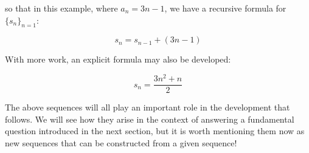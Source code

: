 \documentclass{ximera}
\begin{document}
\begin{example}
\begin{example}
\begin{explanation}
\begin{image}
  \end{image}
so that in this example, where $a_n = 3n-1$, we have a recursive formula for $\{s_n\}_{n=1}$:

\[
s_n = s_{n-1} + (3n-1)
\]  

With more work, an explicit formula may also be developed:

\[
s_n = \frac{3n^2+n}{2}
\]
    
\end{explanation}
\end{example}   
\end{example}

The above sequences will all play an important role in the development that follows.  We will see how they arise in the context of answering a fundamental question introduced in the next section, but it is worth mentioning them now as new sequences that can be constructed from a given sequence!
\end{document}
